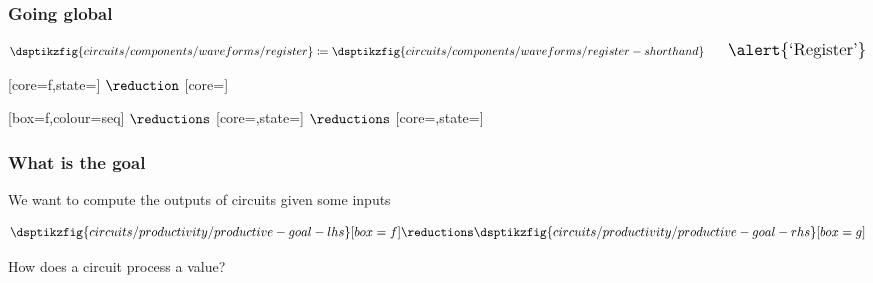 \begin{frame}
    \frametitle{Going global}

    \centering
    \Large

    \await

    \normalsize
    \begin{gather*}
        \dsptikzfig{circuits/components/waveforms/register}
        \coloneqq
        \dsptikzfig{circuits/components/waveforms/register-shorthand}
        \qquad
        \Large
        \text{\alert{`Register'}}
    \end{gather*}

    \vspace{1em}

    \await

    [core=f,state=]
    \Large\(\reduction\)\normalsize
    [core=]

    \await

    [box=f,colour=seq]
    \Large\(\reductions\)\normalsize
    [core=,state=]
    \Large\(\reductions\)\normalsize
    [core=,state=]

\end{frame}
\begin{frame}
    \frametitle{What is the goal}

    \centering

    \await
    \Large
    We want to compute the \alert{outputs} of circuits given some \alert{inputs}
    \normalsize

    \begin{gather*}
        \dsptikzfig{circuits/productivity/productive-goal-lhs}[box=f]
        \reductions
        \dsptikzfig{circuits/productivity/productive-goal-rhs}[box=g]
    \end{gather*}

    \await

    \vspace{1em}

    \Large

    How does a circuit \alert{process} a value?

\end{frame}
